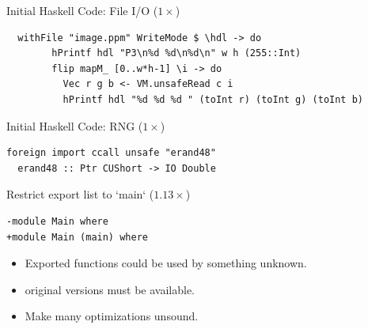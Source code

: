 \documentclass[8pt]{beamer}
\begin{document}
\begin{frame}[fragile]{Initial Haskell Code: File I/O  ($1\times$)}
\begin{verbatim}
  withFile "image.ppm" WriteMode $ \hdl -> do
        hPrintf hdl "P3\n%d %d\n%d\n" w h (255::Int)
        flip mapM_ [0..w*h-1] \i -> do
          Vec r g b <- VM.unsafeRead c i
          hPrintf hdl "%d %d %d " (toInt r) (toInt g) (toInt b)
\end{verbatim}
\end{frame}

\begin{frame}[fragile]{Initial Haskell Code: RNG ($1\times$)}
\begin{verbatim}
foreign import ccall unsafe "erand48"
  erand48 :: Ptr CUShort -> IO Double
\end{verbatim}
\end{frame}


\begin{frame}[fragile]{Restrict export list to `main` ($1.13\times$)}
\begin{verbatim}
-module Main where
+module Main (main) where
\end{verbatim}

\pause
\begin{itemize}
\item Exported functions could be used by something unknown.
\item original versions must be available. \pause
\item Make many optimizations unsound.
\end{itemize}
\end{frame}

\end{document}
